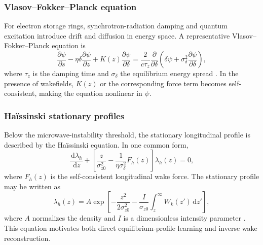 \documentclass[11pt,a4paper]{article}
\providecommand{\dd}{\,\mathrm{d}}
\begin{document}
\begin{sloppypar}
\subsubsection{Vlasov--Fokker--Planck equation}
For electron storage rings, synchrotron-radiation damping and quantum excitation introduce drift and diffusion in energy space. A representative Vlasov--Fokker--Planck equation is
\begin{equation}
    \frac{\partial \psi}{\partial s}
    -\eta\delta\frac{\partial \psi}{\partial z}
    +K(z)\frac{\partial \psi}{\partial \delta}
    =
    \frac{2}{c\tau_z}
    \frac{\partial}{\partial\delta}
    \left(
    \delta\psi+\sigma_\delta^2\frac{\partial\psi}{\partial\delta}
    \right),
    \label{eq:vfp_main}
\end{equation}
where $\tau_z$ is the damping time and $\sigma_\delta$ the equilibrium energy spread \cite{kim_mbtrack2_cuda_2025}. In the presence of wakefields, $K(z)$ or the corresponding force term becomes self-consistent, making the equation nonlinear in $\psi$.

\subsubsection{Ha\"issinski stationary profiles}
Below the microwave-instability threshold, the stationary longitudinal profile is described by the Ha\"issinski equation. In one common form,
\begin{equation}
    \frac{\dd \lambda_h}{\dd z}
    +
    \left[
    \frac{z}{\sigma_{z0}^{2}}
    -
    \frac{1}{\eta\sigma_\delta^2}F_h(z)
    \right]\lambda_h(z)=0,
    \label{eq:haissinski_main}
\end{equation}
where $F_h(z)$ is the self-consistent longitudinal wake force. The stationary profile may be written as
\begin{equation}
    \lambda_h(z)
    =
    A\exp\left[
    -\frac{z^2}{2\sigma_{z0}^{2}}
    -
    \frac{I}{\sigma_{z0}}\int_z^\infty W_k(z')\dd z'
    \right],
    \label{eq:haissinski_solution_main}
\end{equation}
where $A$ normalizes the density and $I$ is a dimensionless intensity parameter \cite{zhou_theories_2023}. This equation motivates both direct equilibrium-profile learning and inverse wake reconstruction.


\end{sloppypar}
\end{document}
